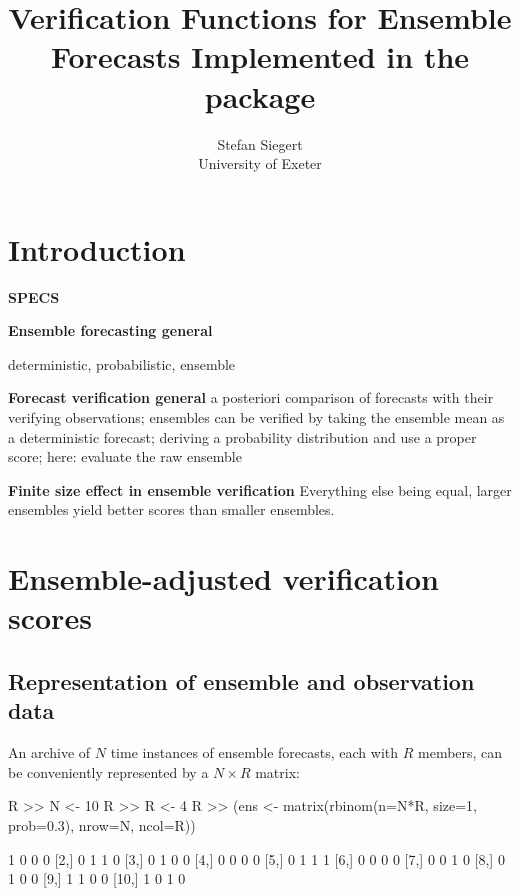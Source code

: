 \documentclass[article]{jss}
\author{Stefan Siegert\\University of Exeter}
\title{Verification Functions for Ensemble Forecasts Implemented in the \proglang{R} package \pkg{SpecsVerification}}
\begin{document}



\section{Introduction}

{\bf SPECS}

{\bf Ensemble forecasting general}

deterministic, probabilistic, ensemble


{\bf Forecast verification general}
a posteriori comparison of forecasts with their verifying observations;
ensembles can be verified by taking the ensemble mean as a deterministic forecast; deriving a probability distribution and use a proper score; here: evaluate the raw ensemble

{\bf Finite size effect in ensemble verification}
Everything else being equal, larger ensembles yield better scores than smaller ensembles.



\section{Ensemble-adjusted verification scores}

\subsection{Representation of ensemble and observation data}

An archive of $N$ time instances of ensemble forecasts, each with $R$ members, can be conveniently represented by a $N\times R$ matrix:

\begin{Schunk}
\begin{Sinput}
R >> N <- 10
R >> R <- 4
R >> (ens <- matrix(rbinom(n=N*R, size=1, prob=0.3), nrow=N, ncol=R))
\end{Sinput}
\begin{Soutput}
      [,1] [,2] [,3] [,4]
 [1,]    1    0    0    0
 [2,]    0    1    1    0
 [3,]    0    1    0    0
 [4,]    0    0    0    0
 [5,]    0    1    1    1
 [6,]    0    0    0    0
 [7,]    0    0    1    0
 [8,]    0    1    0    0
 [9,]    1    1    0    0
[10,]    1    0    1    0
\end{Soutput}
\end{Schunk}
\end{document}
